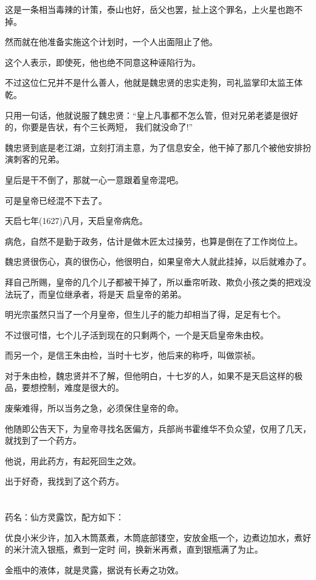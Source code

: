 \documentclass[11pt,a4paper,onecolumn]{article}
\begin{document}
这是一条相当毒辣的计策，泰山也好，岳父也罢，扯上这个罪名，上火星也跑不掉。

然而就在他准备实施这个计划时，一个人出面阻止了他。

这个人表示，即使死，他也绝不同意这种诬陷行为。

不过这位仁兄并不是什么善人，他就是魏忠贤的忠实走狗，司礼监掌印太监王体乾。

只用一句话，他就说服了魏忠贤：``皇上凡事都不怎么管，但对兄弟老婆是很好的，你要是告状，有个三长两短，
我们就没命了!''

魏忠贤到底是老江湖，立刻打消主意，为了信息安全，他干掉了那几个被他安排扮演刺客的兄弟。

皇后是干不倒了，那就一心一意跟着皇帝混吧。

可是皇帝已经混不下去了。

天启七年(1627)八月，天启皇帝病危。

病危，自然不是勤于政务，估计是做木匠太过操劳，也算是倒在了工作岗位上。

魏忠贤很伤心，真的很伤心，他很明白，如果皇帝大人就此挂掉，以后就难办了。

拜自己所赐，皇帝的几个儿子都被干掉了，所以垂帘听政、欺负小孩之类的把戏没法玩了，而皇位继承者，将是天
启皇帝的弟弟。

明光宗虽然只当了一个月皇帝，但生儿子的能力却相当了得，足足有七个。

不过很可惜，七个儿子活到现在的只剩两个，一个是天启皇帝朱由校。

而另一个，是信王朱由检，当时十七岁，他后来的称呼，叫做崇祯。

对于朱由检，魏忠贤并不了解，但他明白，十七岁的人，如果不是天启这样的极品，要想控制，难度是很大的。

废柴难得，所以当务之急，必须保住皇帝的命。

他随即公告天下，为皇帝寻找名医偏方，兵部尚书霍维华不负众望，仅用了几天，就找到了一个药方。

他说，用此药方，有起死回生之效。

出于好奇，我找到了这个药方。

\section[\thesection]{}

药名：仙方灵露饮，配方如下：

优良小米少许，加入木筒蒸煮，木筒底部镂空，安放金瓶一个，边煮边加水，煮好的米汁流入银瓶，煮到一定时
间，换新米再煮，直到银瓶满了为止。

金瓶中的液体，就是灵露，据说有长寿之功效。
\end{document}

